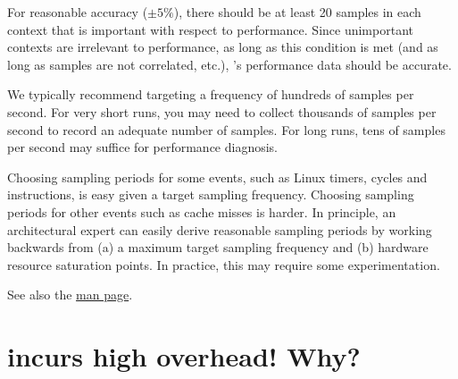 \documentclass[11pt,letterpaper]{report}
\begin{document}
For reasonable accuracy ($\pm 5\%$), there should be at least 20 samples in each context that is important with respect to performance.
Since unimportant contexts are irrelevant to performance, as long as this condition is met (and as long as samples are not correlated, etc.), \HPCToolkit{}'s performance data should be accurate.

We typically recommend targeting a frequency of hundreds of samples per second.
For very short runs, you may need to collect thousands of samples per second to record an adequate number of samples.
For long runs, tens of samples per second may suffice for performance diagnosis.

Choosing sampling periods for some events, such as Linux timers, cycles and instructions, is easy given a target sampling frequency.
Choosing sampling periods for other events such as cache misses is harder.
In principle, an architectural expert can easily derive reasonable sampling periods by working backwards from (a) a maximum target sampling frequency and (b) hardware resource saturation points.
In practice, this may require some experimentation.

See also the \hpcrun{} \href{http://hpctoolkit.org/man/hpcrun.html}{man page}.



\section{\hpcrun{} incurs high overhead! Why?}
\end{document}
